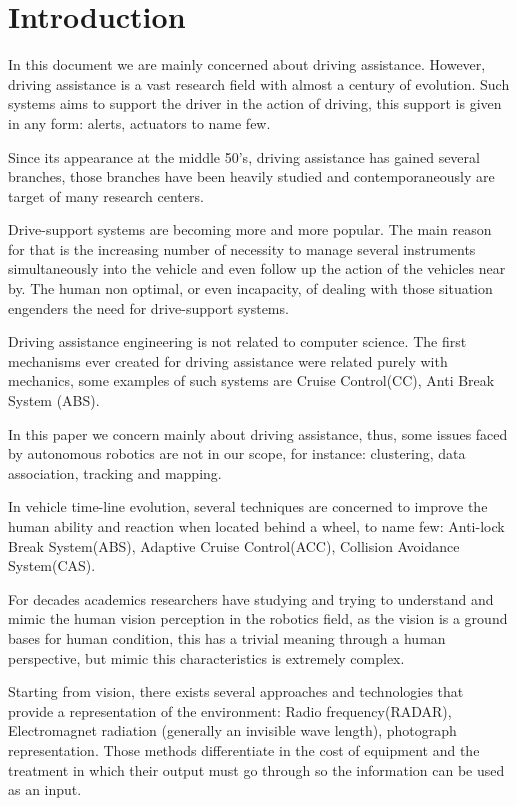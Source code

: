 \section{Introduction}

In this document we are mainly concerned about driving assistance. However, driving assistance is a vast research field with almost a century of evolution. Such systems aims to support the driver in the action of driving, this support is given in any form: alerts, actuators to name few.

Since its appearance at the middle 50's, driving assistance has gained several branches, those branches have been heavily studied and contemporaneously are target of many research centers.

Drive-support systems are becoming more and more popular. The main reason for that is the increasing number of necessity to manage several instruments simultaneously into the vehicle\cite{riener2010sensor} and even follow up the action of the vehicles near by. The human non optimal, or even incapacity, of dealing with those situation engenders the need for drive-support systems.

Driving assistance engineering is not related to computer science. The first mechanisms ever created for driving assistance were related purely with mechanics, some examples of such systems are Cruise Control(CC), Anti Break System (ABS).

In this paper we concern mainly about driving assistance, thus, some issues faced by autonomous robotics are not in our scope, for instance: clustering, data association, tracking and mapping.

In vehicle time-line evolution, several techniques are concerned to improve the human ability and reaction when located behind a wheel, to name few: Anti-lock Break System(ABS), Adaptive Cruise Control(ACC), Collision Avoidance System(CAS).

For decades academics researchers have studying and trying to understand and mimic the human vision perception in the robotics field, as the vision is a ground bases for human condition, this has a trivial meaning through a human perspective, but mimic this characteristics is extremely complex.

Starting from vision, there exists several approaches and technologies that provide a representation of the environment: Radio frequency(RADAR), Electromagnet radiation (generally an invisible wave length), photograph representation. Those methods differentiate in the cost of equipment and the treatment in which their output must go through so the information can be used as an input.

